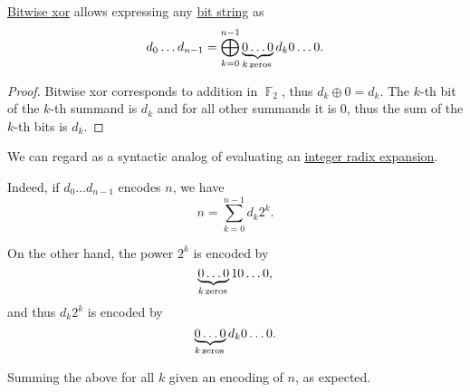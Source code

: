 \begin{proposition}\label{thm:disjoint_sum_via_bitwise_xor}
  \hyperref[def:bitwise_operations]{Bitwise xor} allows expressing any \hyperref[def:bit_string]{bit string} as
  \begin{equation*}
    d_0 \ldots d_{n-1} = \bigoplus_{k=0}^{n-1} \underbrace{0 \ldots 0}_{k \T*{zeros}} d_k 0 \ldots 0.
  \end{equation*}
\end{proposition}
\begin{proof}
  Bitwise xor corresponds to addition in \( \BbbF_2 \), thus \( d_k \oplus 0 = d_k \). The \( k \)-th bit of the \( k \)-th summand is \( d_k \) and for all other summands it is \( 0 \), thus the sum of the \( k \)-th bits is \( d_k \).
\end{proof}

\begin{example}\label{ex:thm:disjoint_sum_via_bitwise_xor}
  We can regard  as a syntactic analog of evaluating an \hyperref[def:integer_radix_expansion]{integer radix expansion}.

  Indeed, if \( d_0 \ldots d_{n-1} \) encodes \( n \), we have
  \begin{equation*}
    n = \sum_{k=0}^{n-1} d_k 2^k.
  \end{equation*}

  On the other hand, the power \( 2^k \) is encoded by
  \begin{equation*}
    \underbrace{0 \ldots 0}_{k \T*{zeros}} 1 0 \ldots 0,
  \end{equation*}
  and thus \( d_k 2^k \) is encoded by
  \begin{equation*}
    \underbrace{0 \ldots 0}_{k \T*{zeros}} d_k 0 \ldots 0.
  \end{equation*}

  Summing the above for all \( k \) given an encoding of \( n \), as expected.
\end{example}
